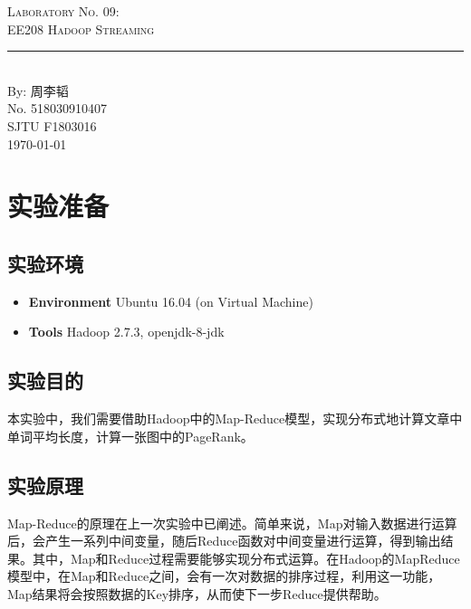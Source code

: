\documentclass{article}
\newcommand{\labno}{09}
\newcommand{\labtitle}{EE208 Hadoop Streaming}
\newcommand{\authorname}{周李韬}
\newcommand{\studentno}{518030910407}
\newcommand{\classno}{F1803016}
\begin{document}
\begin{center}
{\LARGE \textsc{Laboratory No. \labno:} \\ \vspace{4pt}}
{\Large \textsc{\labtitle} \\ \vspace{4pt}} 
\rule[13pt]{\textwidth}{1pt} \\ \vspace{15pt}
{\large By: \authorname \\ \vspace{10pt}
No. \studentno \\ \vspace{10pt}
SJTU \classno \\ \vspace{10pt}
\today \vspace{20pt}}
\end{center}



\section{实验准备}

\subsection{实验环境}
\begin{itemize}
\item\textbf{Environment} Ubuntu 16.04 (on Virtual Machine)
\item\textbf{Tools} Hadoop 2.7.3, openjdk-8-jdk
\end{itemize}

\subsection{实验目的}

本实验中，我们需要借助Hadoop中的Map-Reduce模型，实现分布式地计算文章中单词平均长度，计算一张图中的PageRank。

\subsection{实验原理}

Map-Reduce的原理在上一次实验中已阐述。简单来说，Map对输入数据进行运算后，会产生一系列中间变量，随后Reduce函数对中间变量进行运算，得到输出结果。其中，Map和Reduce过程需要能够实现分布式运算。在Hadoop的MapReduce模型中，在Map和Reduce之间，会有一次对数据的排序过程，利用这一功能，Map结果将会按照数据的Key排序，从而使下一步Reduce提供帮助。
\end{document}
